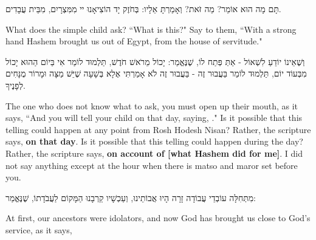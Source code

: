 תָּם מָה הוּא אוֹמֵר? מַה זֹּאת? וְאָמַרְתָּ אֵלָיו: בְּחֹזֶק יָד הוֹצִיאָנוּ יי מִמִּצְרָיִם, מִבֵּית עֲבָדִים.

\begin{english}
What does the simple child ask? ``What is this?" Say to them, ``With a strong hand Hashem brought us out of Egypt, from the house of servitude."
\end{english}

וְשֶׁאֵינוֹ יוֹדֵעַ לִשְׁאוֹל - אַתְּ פְּתַח לוֹ, שֶׁנֶּאֱמַר: יָכוֹל מֵרֹאשׁ חֹדֶשׁ, תַּלְמוּד לוֹמַר  אִי בַּיוֹם הַהוּא יָכוֹל מִבְּעוֹד יוֹם, תַּלְמוּד לוֹמַר בַּעֲבוּר זֶה - בַּעֲבוּר זֶה לֹא אָמַרְתִּי אֶלָא בְּשָׁעָה שֶׁיֵּשׁ מַצָּה וּמָרוֹר מֻנָּחִים לְפָנֶיךָ.

\begin{english}
The one who does not know what to ask, you must open up their mouth, as it says, ``And you will tell your child on that day, saying, ." Is it possible that this telling could happen at any point from Rosh Hodesh Nisan? Rather, the scripture says, {\bfseries on that day}. Is it possible that this telling could happen during the day? Rather, the scripture says, {\bfseries on account of [what Hashem did for me]}. I did not say anything except at the hour when there is matso and maror set before you.
\end{english}

\vspace{1em}

מִתְּחִלָּה עוֹבְדֵי עֲבוֹדָה זָרָה הָיוּ אֲבוֹתֵינוּ, וְעַכְשָׁיו קֵרְבָנוּ הַמָּקוֹם לַעֲבֹדָתוֹ, 
שֶׁנֶּאֱמַר:

\begin{english}
At first, our ancestors were idolators, and now God has brought us close to God's service, as it says, 
\end{english}

